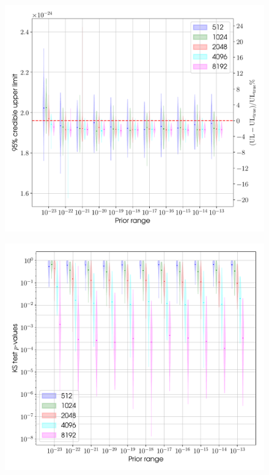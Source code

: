 \begin{figure}[phtb]
\begin{center}
\includegraphics[width=1\columnwidth]{./figures/proptesting/walk_prop/upperlimits/collate_plots_wp_uls}
\caption{ \protect}
\end{center}
\end{figure}

\begin{figure}[phtb]
\begin{center}
\includegraphics[width=1\columnwidth]{./figures/proptesting/walk_prop/kstest/collate_plots_wp_ks}
\caption{ \protect}
\end{center}
\end{figure}

